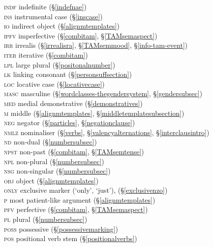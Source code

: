 \begin{tabbing}
	\textsc{indf} \> {indefinite (\S\ref{indefnae})}\\
	\textsc{ins} \> {instrumental case (\S\ref{inscase})}\\
	\textsc{io} \> {indirect object (\S\ref{alignmtemplates})}\\
	\textsc{ipfv} \> {imperfective (\S\ref{combitam}, \S\ref{TAMsemaspect})}\\
	\textsc{irr} \> {irrealis (\S\ref{irrealisra}, \S\ref{TAMsemmood}, \S\ref{info-tam-event})}\\
	\textsc{iter} \> {iterative  (\S\ref{combitam})}\\
	\textsc{lpl} \> {large plural (\S\ref{positonalnumber})}\\
	\textsc{lk} \> {linking consonant (\S\ref{personsuffsection})}\\
	\textsc{loc} \> {locative case (\S\ref{locativecase})}\\
	\textsc{masc} \> {masculine (\S\ref{wordclasses-thegendersystem}, \S\ref{gendersubsec})}\\
	\textsc{med} \> {medial demonstrative (\S\ref{demonstratives})}\\
	\textsc{m} \> {middle (\S\ref{alignmtemplates}, \S\ref{middletemplatesubsection})}\\
	\textsc{neg} \> {negator (\S\ref{particles}, \S\ref{negationclause})} \\
	\textsc{nmlz} \> {nominaliser (\S\ref{verbs}, \S\ref{valencyalternations}, \S\ref{interclausintro})}\\
	\textsc{nd} \> {non-dual (\S\ref{numbersubsec})}\\
	\textsc{npst} \> {non-past (\S\ref{combitam}, \S\ref{TAMsemtense})}\\
	\textsc{npl} \> {non-plural (\S\ref{numbersubsec})}\\
	\textsc{nsg} \> {non-singular (\S\ref{numbersubsec})}\\
	\textsc{obj} \> {object (\S\ref{alignmtemplates})}\\
	\textsc{only} \> {exclusive marker (`only', `just'), (\S\ref{exclusivenzo})}\\
	\textsc{p} \> {most patient-like argument (\S\ref{alignmtemplates})}\\
	\textsc{pfv} \> {perfective (\S\ref{combitam}, \S\ref{TAMsemaspect})}\\
	\textsc{pl} \> {plural (\S\ref{numbersubsec})}\\
	\textsc{poss} \> {possessive (\S\ref{possessivemarking})}\\
	\textsc{pos} \> {positional verb stem (\S\ref{positionalverbs})}\\

\end{tabbing}

